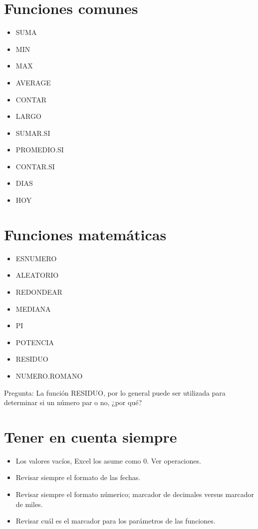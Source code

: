 \documentclass[12 pt,letterpaper]{article}
\begin{document}
\section{Funciones comunes}

\begin{itemize}
	\item SUMA
	\item MIN
	\item MAX
	\item AVERAGE
	\item CONTAR
	\item LARGO
	\item SUMAR.SI
	\item PROMEDIO.SI
	\item CONTAR.SI
	\item DIAS
	\item HOY
\end{itemize}

\section{Funciones matemáticas}

\begin{itemize}
	\item ESNUMERO
	\item ALEATORIO
	\item REDONDEAR
	\item MEDIANA
	\item PI
	\item POTENCIA
	\item RESIDUO
	\item NUMERO.ROMANO
\end{itemize}

\noindent
{\Huge\faComment} Pregunta: La función RESIDUO, por lo general puede ser utilizada para determinar si un número par o no, ¿por qué?

\section{Tener en cuenta siempre}

\begin{itemize}
	\item Los valores vacíos, Excel los asume como 0. Ver operaciones. 
	\item Revisar siempre el formato de las fechas.
	\item Revisar siempre el formato númerico; marcador de decimales versus marcador de miles. 
	\item Revisar cuál es el marcador para los parámetros de las funciones. 
\end{itemize}
\end{document}
